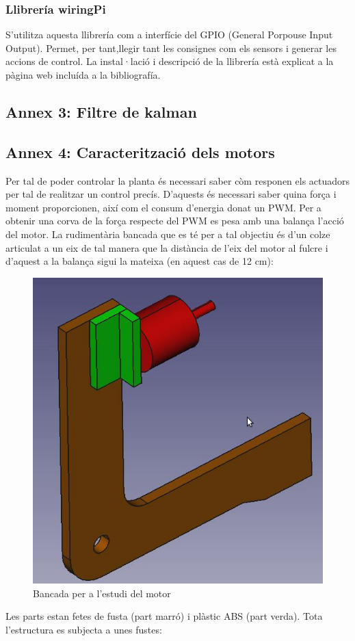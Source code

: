 \documentclass[twoside]{article}
\begin{document}
\subsubsection*{Llibrería wiringPi}
S'utilitza aquesta llibrería\cite{wiringPi} com a interfície del GPIO (General Porpouse Input Output). Permet, per tant,llegir tant les consignes com els sensors i generar les accions de control. 
La instal·lació i descripció de la llibrería està explicat a la pàgina web incluída a la bibliografía.

\newpage
\subsection*{Annex 3: Filtre de kalman}
\newpage
\subsection*{Annex 4: Caracterització dels motors}
Per tal de poder controlar la planta és necessari saber còm responen els actuadors per tal de realitzar un control precís. D'aquests és necessari saber quina força i moment proporcionen, així com el consum d'energia donat un PWM. 
Per a obtenir una corva de la força respecte del PWM es pesa amb una balança l'acció del motor. La rudimentària bancada que es té per a tal objectiu és d'un colze articulat a un eix de tal manera que la distància de l'eix del motor al fulcre i d'aquest a la balança sigui la mateixa (en aquest cas de 12 cm):

\begin{figure}[h!]
\begin{center}
\includegraphics[scale=0.4]{images/bancada1.jpeg}
\caption{Bancada per a l'estudi del motor}
\end{center}
\end{figure}
Les parts estan fetes de fusta (part marró) i plàstic ABS (part verda). Tota l'estructura es subjecta a unes fustes:
\end{document}
